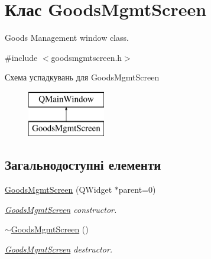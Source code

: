 \hypertarget{classGoodsMgmtScreen}{\section{Клас Goods\-Mgmt\-Screen}
\label{classGoodsMgmtScreen}
}


Goods Management window class.  




{\ttfamily \#include $<$goodsmgmtscreen.\-h$>$}

Схема успадкувань для Goods\-Mgmt\-Screen\begin{figure}[H]
\begin{center}
\leavevmode
\includegraphics[height=2.000000cm]{classGoodsMgmtScreen}
\end{center}
\end{figure}
\subsection*{Загальнодоступні елементи}
\begin{DoxyCompactItemize}
\item 
\hyperlink{classGoodsMgmtScreen_a23df1d60103959e1b6fc32852aec9873}{Goods\-Mgmt\-Screen} (Q\-Widget $\ast$parent=0)
\begin{DoxyCompactList}\small\item\em \hyperlink{classGoodsMgmtScreen}{Goods\-Mgmt\-Screen} constructor. \end{DoxyCompactList}\item 
\hypertarget{classGoodsMgmtScreen_a0ab5666478d7b8fa00843aa127ce2a3b}{\hyperlink{classGoodsMgmtScreen_a0ab5666478d7b8fa00843aa127ce2a3b}{$\sim$\-Goods\-Mgmt\-Screen} ()}\label{classGoodsMgmtScreen_a0ab5666478d7b8fa00843aa127ce2a3b}

\begin{DoxyCompactList}\small\item\em \hyperlink{classGoodsMgmtScreen}{Goods\-Mgmt\-Screen} destructor. \end{DoxyCompactList}\end{DoxyCompactItemize}

